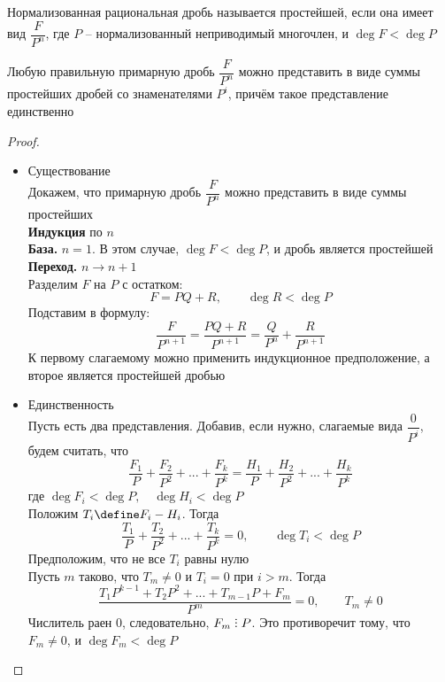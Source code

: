 \begin{definition}
	Нормализованная рациональная дробь называется простейшей, если она имеет вид $\dfrac{F}{P^n}$, где $P$ -- нормализованный неприводимый многочлен, и $ \deg F < \deg P$
\end{definition}

\begin{lemma}
	Любую правильную примарную дробь $\dfrac{F}{P^n}$ можно представить в виде суммы простейших дробей со знаменателями $P^i$, причём такое представление единственно
\end{lemma}

\begin{proof}
	\hfill
	\begin{itemize}
		\item Существование \\
		Докажем, что примарную дробь $\dfrac{F}{P^n}$ можно представить в виде суммы простейших \\
		\textbf{Индукция} по $n$ \\
		\textbf{База.} $n = 1$. В этом случае, $\deg F < \deg P$, и дробь является простейшей \\
		\textbf{Переход.} $n \to n + 1$ \\
		Разделим $F$ на $P$ с остатком:
		$$ F = PQ + R, \qquad \deg R < \deg P $$
		Подставим в формулу:
		$$ \frac{F}{P^{n + 1}} = \frac{PQ + R}{P^{n + 1}} = \frac{Q}{P^n} + \frac{R}{P^{n + 1}} $$
		К первому слагаемому можно применить индукционное предположение, а второе является простейшей дробью
		\item Единственность \\
		Пусть есть два представления. Добавив, если нужно, слагаемые вида $\dfrac0{P^i}$, будем считать, что
		$$ \frac{F_1}P + \frac{F_2}{P^2} + ... + \frac{F_k}{P^k} = \frac{H_1}P + \frac{H_2}{P^2} + ... + \frac{H_k}{P^k} $$
		где $ \deg F_i < \deg P, \quad \deg H_i < \deg P $ \\
		Положим $T_i \define F_i - H_i$. Тогда
		$$ \frac{T_1}P + \frac{T_2}{P^2} + ... + \frac{T_k}{P^k} = 0, \qquad \deg T_i < \deg P $$
		Предположим, что не все $T_i$ равны нулю \\
		Пусть $m$ таково, что $T_m \ne 0$ и $T_i = 0$ при $i > m$. Тогда
		$$ \frac{T_1P^{k - 1} + T_2P^2 + ... + T_{m - 1}P + F_m}{P^m} = 0, \qquad T_m \ne 0 $$
		Числитель раен $0$, следовательно, $F_m \divby P$. Это противоречит тому, что $F_m \ne 0$, и $ \deg F_m < \deg P $
	\end{itemize}
\end{proof}

